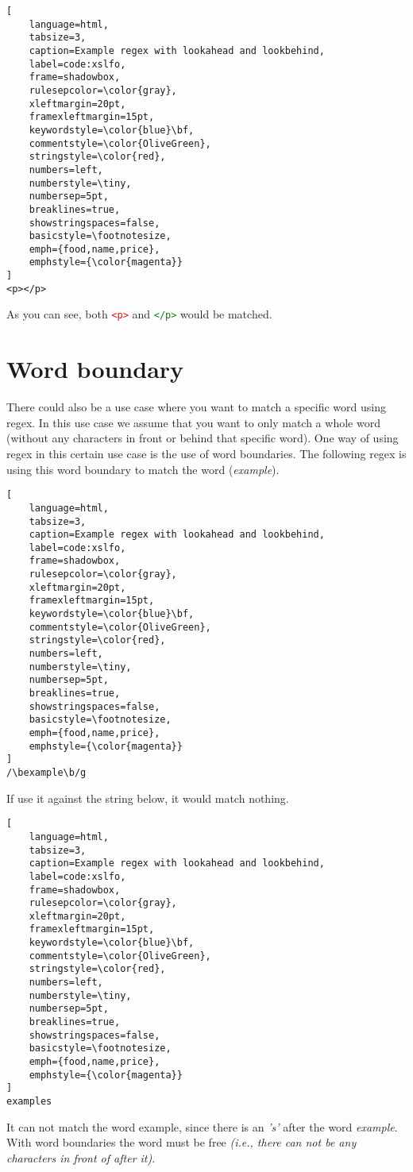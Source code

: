 \begin{lstlisting}[
	language=html,
	tabsize=3,
	caption=Example regex with lookahead and lookbehind,
	label=code:xslfo,
	frame=shadowbox,
	rulesepcolor=\color{gray},
	xleftmargin=20pt,
	framexleftmargin=15pt,
	keywordstyle=\color{blue}\bf,
	commentstyle=\color{OliveGreen},
	stringstyle=\color{red},
	numbers=left,
	numberstyle=\tiny,
	numbersep=5pt,
	breaklines=true,
	showstringspaces=false,
	basicstyle=\footnotesize,
	emph={food,name,price},
	emphstyle={\color{magenta}}
]
<p></p>
\end{lstlisting}
As you can see, both \textcolor{red}{\texttt{<p>}} and \textcolor{green}{\texttt{</p>}} would be matched.

\section{Word boundary}
\label{sec:word-boundary}
There could also be a use case where you want to match a specific word using regex. In this use case we assume that you want to only match a whole word (without any characters in front or behind that specific word). One way of using regex in this certain use case is the use of word boundaries. The following regex is using this word boundary to match the word (\textit{example}).

\begin{lstlisting}[
	language=html,
	tabsize=3,
	caption=Example regex with lookahead and lookbehind,
	label=code:xslfo,
	frame=shadowbox,
	rulesepcolor=\color{gray},
	xleftmargin=20pt,
	framexleftmargin=15pt,
	keywordstyle=\color{blue}\bf,
	commentstyle=\color{OliveGreen},
	stringstyle=\color{red},
	numbers=left,
	numberstyle=\tiny,
	numbersep=5pt,
	breaklines=true,
	showstringspaces=false,
	basicstyle=\footnotesize,
	emph={food,name,price},
	emphstyle={\color{magenta}}
]
/\bexample\b/g
\end{lstlisting}
\label{exmp:word-boundarie-regex}

If use it against the string below, it would match nothing.
\begin{lstlisting}[
	language=html,
	tabsize=3,
	caption=Example regex with lookahead and lookbehind,
	label=code:xslfo,
	frame=shadowbox,
	rulesepcolor=\color{gray},
	xleftmargin=20pt,
	framexleftmargin=15pt,
	keywordstyle=\color{blue}\bf,
	commentstyle=\color{OliveGreen},
	stringstyle=\color{red},
	numbers=left,
	numberstyle=\tiny,
	numbersep=5pt,
	breaklines=true,
	showstringspaces=false,
	basicstyle=\footnotesize,
	emph={food,name,price},
	emphstyle={\color{magenta}}
]
examples
\end{lstlisting}
It can not match the word example, since there is an \textit{'s'} after the word \textit{example}. With word boundaries the word must be free \textit{(i.e., there can not be any characters in front of after it)}.

